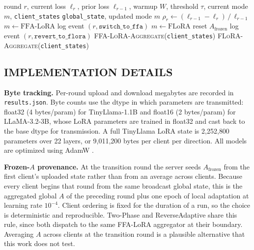 \begin{algorithm}[t]
\caption{ReverseAdaptive aggregator (per round)}
\label{alg:reverseadaptive}
\footnotesize
\begin{algorithmic}[1]
\Require round $r$, current loss $\ell_r$, prior loss $\ell_{r-1}$,
         warmup $W$, threshold $\tau$, current mode $m$, \texttt{client\_states}
\Ensure \texttt{global\_state}, updated mode $m$
\State $\rho_r \leftarrow (\ell_{r-1} - \ell_r) \,/\, \ell_{r-1}$ 
    \State $m \leftarrow \text{FFA-LoRA}$
    \State log event $(r, \texttt{switch\_to\_ffa})$
 
    \State $m \leftarrow \text{FLoRA}$
    \State reset $A_{\text{frozen}}$
    \State log event $(r, \texttt{revert\_to\_flora})$
\EndIf
{}
    \State \Return \textsc{FFA-LoRA-Aggregate}(\texttt{client\_states})
\Else
    \State \Return \textsc{FLoRA-Aggregate}(\texttt{client\_states})
\EndIf
\end{algorithmic}
\end{algorithm}

\subsection{IMPLEMENTATION DETAILS}
\label{sec:implementation}
\textbf{Byte tracking.}
Per-round upload and download megabytes are recorded in \texttt{results.json}. Byte counts use the dtype in which parameters are transmitted: float32 (4 bytes/param) for TinyLlama-1.1B and float16 (2 bytes/param) for LLaMA-3.2-3B, whose LoRA parameters are trained in float32 and cast back to the base dtype for transmission. A full TinyLlama LoRA state is 2{,}252{,}800 parameters over 22 layers, or 9{,}011{,}200 bytes per client per direction. All models are optimized using AdamW \cite{loshchilov2019decoupled}.

\textbf{Frozen-$A$ provenance.} At the transition round the server seeds $A_{\text{frozen}}$ from the first client's uploaded state rather than from an average across clients. Because every client begins that round from the same broadcast global state, this is the aggregated global $A$ of the preceding round plus one epoch of local adaptation at learning rate $10^{-4}$. Client ordering is fixed for the duration of a run, so the choice is deterministic and reproducible. Two-Phase and ReverseAdaptive share this rule, since both dispatch to the same FFA-LoRA aggregator at their boundary. Averaging $A$ across clients at the transition round is a plausible alternative that this work does not test.

